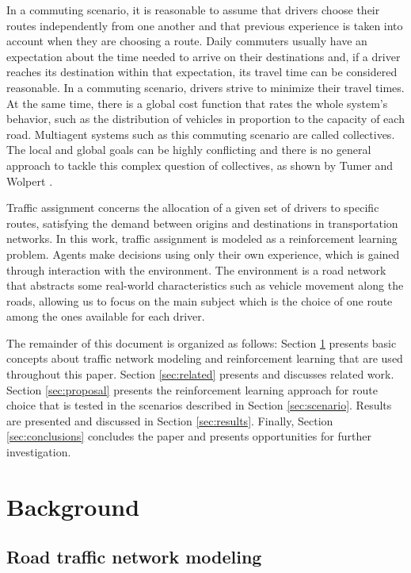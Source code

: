 \documentclass{RITA}
\begin{document}
In a commuting scenario, it is reasonable to assume that drivers choose their routes independently from one another and that previous experience is taken into account when they are choosing a route. Daily commuters usually have an expectation about the time needed to arrive on their destinations and, if a driver reaches its destination within that expectation, its travel time can be considered  reasonable. In a commuting scenario, drivers strive to minimize their travel times. At the same time, there is a global cost function that rates the whole system's behavior, such as the distribution of vehicles in proportion to the capacity of each road. Multiagent systems such as this commuting scenario are called collectives. The local and global goals can be highly conflicting and there is no general approach to tackle this complex question of collectives, as shown by Tumer and Wolpert \cite{Tumer&Wolpert2004}.

Traffic assignment concerns the allocation of a given set of drivers to specific routes, satisfying the demand between origins and destinations in transportation networks. In this work, traffic assignment is modeled as a reinforcement learning problem. Agents make decisions using only their own experience, which is gained through interaction with the environment. The environment is a road network that abstracts some real-world characteristics such as vehicle movement along the roads, allowing us to focus on the main subject which is the choice of one route among the ones available for each driver.

The remainder of this document is organized as follows: Section \ref{sec:concepts} presents basic concepts about traffic network modeling and reinforcement learning that are used throughout this paper. Section \ref{sec:related} presents and discusses related work. Section \ref{sec:proposal} presents the reinforcement learning approach for route choice that is tested in the scenarios described in Section \ref{sec:scenario}. Results are presented and discussed in Section \ref{sec:results}. Finally, Section \ref{sec:conclusions} concludes the paper and presents opportunities for further investigation.

\section{Background}
\label{sec:concepts}
\subsection{Road traffic network modeling}
\end{document}
